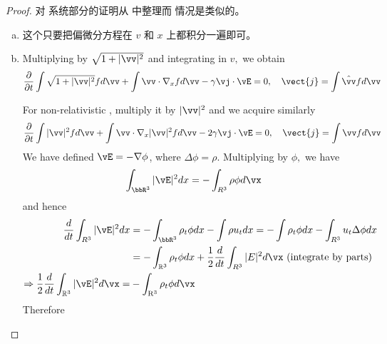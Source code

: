 \begin{proof}
  
    对 \eqrvp 系统部分的证明从 \cite{glassey_symmetric_1985} 中整理而 \eqvp 情况是类似的。

    \begin{enumerate}[(a)]
      \item 这个只要把偏微分方程在 $v$ 和 $x$ 上都积分一遍即可。
      \item
      
      Multiplying \eqrvp by $\sqrt{1+|\vv|^{2}}$ and integrating in $v,$ we obtain
      \begin{equation}
        \label{eq:rvp_second_moment}
        \frac{\partial}{\partial t} \int \sqrt{1+|\vv|^{2}} f d \vv+\int \vv \cdot \nabla_{x} f d \vv-\gamma \vj \cdot \vE=0, \quad \vect{j}=\int \hat{\vv}f d \vv
      \end{equation}

      For non-relativistic \eqvp, multiply it by $|\vv|^2$ and we acquire similarly
      \begin{equation}
        \label{eq:vp_second_moment}
        \frac{\partial}{\partial t} \int |\vv|^{2} f d \vv+\int \vv \cdot \nabla_{x} |\vv|^2 f d \vv-2\gamma \vj \cdot \vE=0, \quad \vect{j}=\int \vv f d \vv
      \end{equation}
       We have defined $\vE= - \nabla \phi$, where $\Delta \phi=\rho$. Multiplying by $\phi,$ we have
      \[
      \int_{\bbR^{3}}|\vE|^{2} d x=-\int_{R^{3}} \rho \phi d \vx
      \]
      and hence
      \[
      \begin{aligned}
      \frac{d}{d t} \int_{R^{3}}|\vE|^{2} d x &=-\int_{\bbR^{3}} \rho_{t} \phi d x-\int \rho u_{t} d x=-\int \rho_{t} \phi d x-\int_{R^{3}} u_{t} \Delta \phi d x \\
      &=-\int_{\mathbb{R}^{3}} \rho_{t} \phi d x+\frac{1}{2} \frac{d}{d t} \int_{R^{3}}|E|^{2} d \vx \text{ (integrate by parts)}\\
      \Rightarrow \frac{1}{2} \frac{d}{d t} \int_{\mathbb{R}^{3}}|\vE|^{2} d \vx=&-\int_{\mathrm{R}^{3}} \rho_{t} \phi d \vx
      \end{aligned}
      \]
      Therefore
      

\end{enumerate}
\end{proof}
